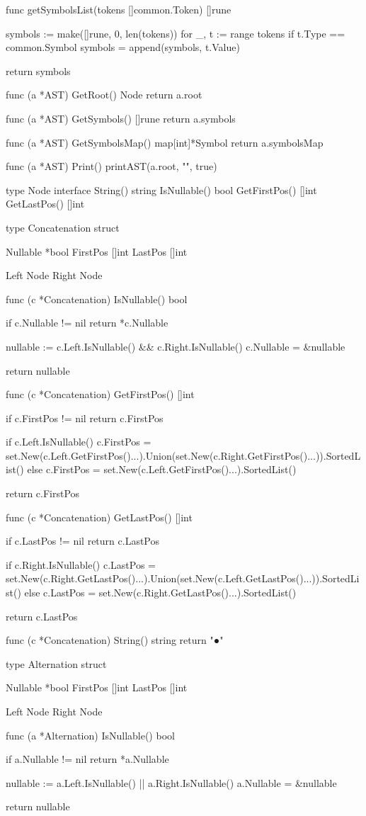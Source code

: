 func getSymbolsList(tokens []common.Token) []rune {
	symbols := make([]rune, 0, len(tokens))
	for _, t := range tokens {
		if t.Type == common.Symbol {
			symbols = append(symbols, t.Value)
		}
	}

	return symbols
}

func (a *AST) GetRoot() Node {
	return a.root
}

func (a *AST) GetSymbols() []rune {
	return a.symbols
}

func (a *AST) GetSymbolsMap() map[int]*Symbol {
	return a.symbolsMap
}

func (a *AST) Print() {
	printAST(a.root, "", true)
}

type Node interface {
	String() string
	IsNullable() bool
	GetFirstPos() []int
	GetLastPos() []int
}

type Concatenation struct {
	Nullable *bool
	FirstPos []int
	LastPos  []int

	Left  Node
	Right Node
}

func (c *Concatenation) IsNullable() bool {
	if c.Nullable != nil {
		return *c.Nullable
	}

	nullable := c.Left.IsNullable() && c.Right.IsNullable()
	c.Nullable = &nullable

	return nullable
}

func (c *Concatenation) GetFirstPos() []int {
	if c.FirstPos != nil {
		return c.FirstPos
	}

	if c.Left.IsNullable() {
		c.FirstPos = set.New(c.Left.GetFirstPos()...).Union(set.New(c.Right.GetFirstPos()...)).SortedList()
	} else {
		c.FirstPos = set.New(c.Left.GetFirstPos()...).SortedList()
	}

	return c.FirstPos
}

func (c *Concatenation) GetLastPos() []int {
	if c.LastPos != nil {
		return c.LastPos
	}

	if c.Right.IsNullable() {
		c.LastPos = set.New(c.Right.GetLastPos()...).Union(set.New(c.Left.GetLastPos()...)).SortedList()
	} else {
		c.LastPos = set.New(c.Right.GetLastPos()...).SortedList()
	}

	return c.LastPos
}

func (c *Concatenation) String() string {
	return "●"
}

type Alternation struct {
	Nullable *bool
	FirstPos []int
	LastPos  []int

	Left  Node
	Right Node
}

func (a *Alternation) IsNullable() bool {
	if a.Nullable != nil {
		return *a.Nullable
	}

	nullable := a.Left.IsNullable() || a.Right.IsNullable()
	a.Nullable = &nullable

	return nullable
}

